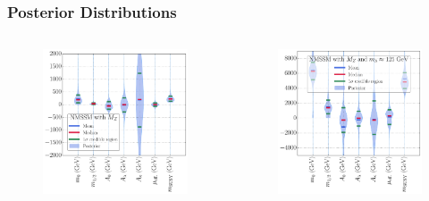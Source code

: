 \documentclass[10pt,aspectratio=169]{beamer}
\begin{document}
\begin{frame}
  \frametitle{Posterior Distributions}
  \begin{columns}[t]
    \begin{column}{0.3\textwidth}
      \vspace{-20pt}
      \begin{figure}
        \centering
        \includegraphics[width=\textwidth]{CNMSSM_mz_violin}
      \end{figure}
    \end{column}
    \begin{column}{0.3\textwidth}
      \vspace{-20pt}
      \begin{figure}
        \centering
        \includegraphics[width=\textwidth]{CNMSSM_mzmh_violin}

\end{figure}
\end{column}
\end{columns}
\end{frame}
\end{document}
